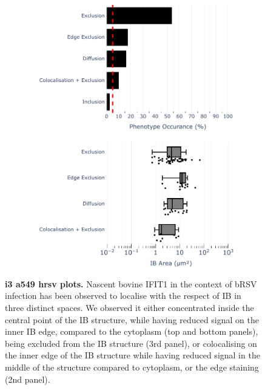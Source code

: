 \begin{figure}
    \begin{subfigure}{0.495\textwidth}
        \caption{}
        \includegraphics[width=1\linewidth]{09. Chapter 4/Figs/02. Infection/02. IFIT3/01. bar_i3_a549.pdf} 
    \end{subfigure}
    \begin{subfigure}{0.495\textwidth}
        \caption{}
        \includegraphics[width=1\linewidth]{09. Chapter 4/Figs/02. Infection/02. IFIT3/02. box_i3_a549.pdf}
    \end{subfigure}
    \caption[i3 a549 hrsv plots]{\textbf{i3 a549 hrsv plots.} Nascent bovine IFIT1 in the context of bRSV infection has been observed to localise with the respect of IB in three distinct spaces. We observed it either concentrated inside the central point of the IB structure, while having reduced signal on the inner IB edge, compared to the cytoplasm (top and bottom panels), being excluded from the IB structure (3rd panel), or colocalising on the inner edge of the IB structure while having reduced signal in the middle of the structure compared to cytoplasm, or the edge staining (2nd panel).}
    \label{fig:i3 a549 hrsv plots}
\end{figure}

